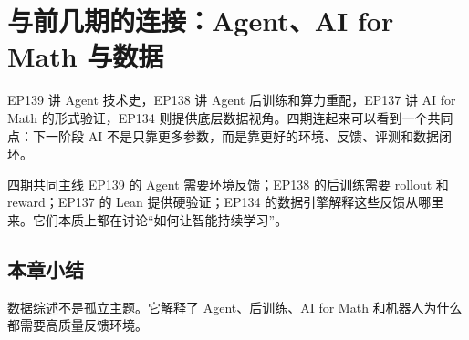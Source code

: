 \section{与前几期的连接：Agent、AI for Math 与数据}

EP139 讲 Agent 技术史，EP138 讲 Agent 后训练和算力重配，EP137 讲 AI for Math 的形式验证，EP134 则提供底层数据视角。四期连起来可以看到一个共同点：下一阶段 AI 不是只靠更多参数，而是靠更好的环境、反馈、评测和数据闭环。

\begin{knowledgebox}{四期共同主线}
EP139 的 Agent 需要环境反馈；EP138 的后训练需要 rollout 和 reward；EP137 的 Lean 提供硬验证；EP134 的数据引擎解释这些反馈从哪里来。它们本质上都在讨论“如何让智能持续学习”。
\end{knowledgebox}

\subsection{本章小结}

数据综述不是孤立主题。它解释了 Agent、后训练、AI for Math 和机器人为什么都需要高质量反馈环境。


